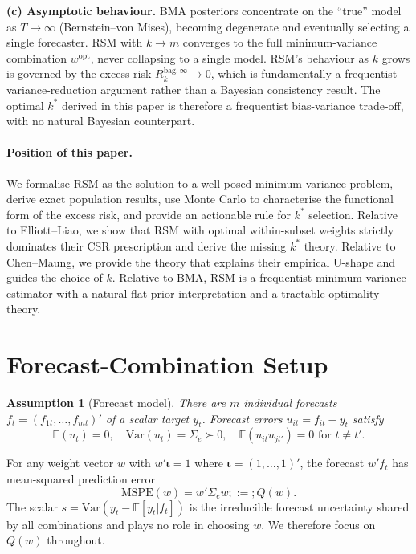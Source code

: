 \documentclass[12pt,a4paper]{article}
\newtheorem{assumption}{Assumption}
\theoremstyle{definition}
\newcommand{\Sig}{\Sigma_e}
\newcommand{\wopt}{w^{\mathrm{opt}}}
\newcommand{\Rk}{R_k^{\mathrm{bag},\infty}}
\newcommand{\E}{\mathbb{E}}
\newcommand{\Var}{\mathrm{Var}}
\begin{document}
\textbf{(c) Asymptotic behaviour.}  BMA posteriors concentrate on the
``true'' model as $T\to\infty$ (Bernstein--von Mises), becoming degenerate
and eventually selecting a single forecaster.  RSM with $k\to m$ converges
to the full minimum-variance combination $\wopt$, never collapsing to a
single model.  RSM's behaviour as $k$ grows is governed by the excess risk
$\Rk\to 0$, which is fundamentally a frequentist variance-reduction
argument rather than a Bayesian consistency result.  The optimal $k^*$
derived in this paper is therefore a frequentist bias-variance trade-off,
with no natural Bayesian counterpart.

\paragraph{Position of this paper.}
We formalise RSM as the solution to a well-posed minimum-variance
problem, derive exact population results, use Monte Carlo to characterise
the functional form of the excess risk, and provide an actionable rule for
$k^*$ selection.  Relative to Elliott--Liao, we show that RSM with
optimal within-subset weights strictly dominates their CSR prescription
and derive the missing $k^*$ theory.  Relative to Chen--Maung, we provide
the theory that explains their empirical U-shape and guides the choice of
$k$.  Relative to BMA, RSM is a frequentist minimum-variance estimator
with a natural flat-prior interpretation and a tractable optimality theory.

\section{Forecast-Combination Setup}
\label{sec:setup}

\begin{assumption}[Forecast model]\label{ass:fc}
There are $m$ individual forecasts $f_t=(f_{1t},\ldots,f_{mt})'$ of a
scalar target $y_t$.  Forecast errors $u_{it}=f_{it}-y_t$ satisfy
\[
\E(u_t)=0,\quad \Var(u_t)=\Sig\succ 0,\quad
\E(u_{it}u_{jt'})=0\text{ for }t\neq t'.
\]
\end{assumption}

For any weight vector $w$ with $w'\bm{\iota}=1$ where
$\bm{\iota}=(1,\ldots,1)'$, the forecast $w'f_t$ has mean-squared
prediction error
\begin{equation}\label{eq:mspe}
  \mathrm{MSPE}(w)=w'\Sig w;:=; Q(w).
\end{equation}
The scalar $s = \mathrm{Var}(y_t - \E[y_t|f_t])$ is the irreducible
forecast uncertainty shared by all combinations and plays no role in
choosing $w$.  We therefore focus on $Q(w)$ throughout.
\end{document}
